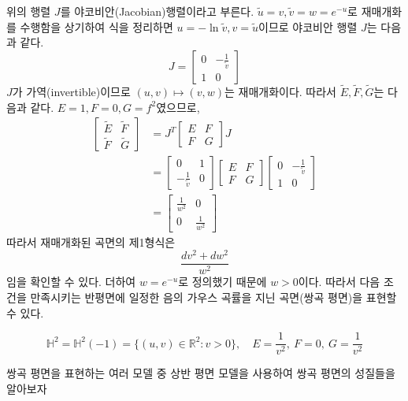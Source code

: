 \documentclass[10pt,a4paper]{article}
\begin{document}
위의 행렬 $J$를 야코비안(Jacobian)행렬이라고 부른다. $\tilde{u} = v, \tilde{v}=w=e^{-u}$로 재매개화를 수행함을 상기하여 식을 정리하면 $u = -\ln \tilde{v}, v = \tilde{u}$이므로 야코비안 행렬 $J$는 다음과 같다.
\[
J = \begin{bmatrix}
0 & -\frac{1}{\tilde{v}} \\
1 & 0 
\end{bmatrix}
\]
$J$가 가역(invertible)이므로 $(u,v) \mapsto (v,w)$는 재매개화이다. 따라서 $\tilde{E}, \tilde{F}, \tilde{G}$는 다음과 같다. $E = 1, F = 0, G = f^{2}$였으므로,
\begin{align*}
\begin{bmatrix}
\tilde{E} & \tilde{F} \\
\tilde{F} & \tilde{G}
\end{bmatrix} &= J^{T} \begin{bmatrix} E & F \\ F & G \end{bmatrix} J \\
&= \begin{bmatrix}
0 & 1 \\
-\frac{1}{\tilde{v}} & 0 
\end{bmatrix} \begin{bmatrix} E & F \\ F & G \end{bmatrix} \begin{bmatrix}
0 & -\frac{1}{\tilde{v}} \\
1 & 0 
\end{bmatrix} \\
&= \begin{bmatrix}
\frac{1}{w^2} & 0 \\
0 & \frac{1}{w^2}
\end{bmatrix}
\end{align*}
따라서 재매개화된 곡면의 제1형식은 \[\frac{dv^2 + dw^2}{w^2}\]임을 확인할 수 있다. 더하여 $w = e^{-u}$로 정의했기 때문에 $w > 0$이다. 따라서 다음 조건을 만족시키는 반평면에 일정한 음의 가우스 곡률을 지닌 곡면(쌍곡 평면)을 표현할 수 있다.
\begin{tcolorbox}[title=상반 평면 모델(Upper-half plane model)]\[ \mathbb{H}^{2} = \mathbb{H}^{2}(-1) = \{(u, v) \in \mathbb{R}^{2} : v > 0 \},\quad
E=\frac{1}{v^2},~F=0,~G=\frac{1}{v^2}
\]
\end{tcolorbox}
쌍곡 평면을 표현하는 여러 모델 중 상반 평면 모델을 사용하여 쌍곡 평면의 성질들을 알아보자
%
%
\end{document}
